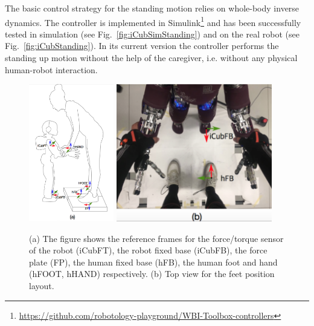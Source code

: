 The basic control strategy for the standing motion relies on whole-body inverse dynamics.
The controller is implemented in Simulink\footnote{\url{https://github.com/robotology-playground/WBI-Toolbox-controllers}}
and has been successfully tested in 
simulation (see Fig.~\ref{fig:iCubSimStanding}) and on the real robot (see Fig.~\ref{fig:iCubStanding}).
In its current version the controller performs the standing up motion without the help
of the caregiver, i.e. without any physical human-robot interaction. 

  
%
\begin{figure}[ht]
  \centering
    \includegraphics[height=6cm]{figs/interaction_lateralAndTop2} \hspace{1cm}
    \includegraphics[height=6cm]{figs/interaction_lateralAndTop}
          \caption{(a) The figure shows the
		  reference frames for the force/torque sensor of the robot (iCubFT), the robot fixed
		   base (iCubFB), the force plate (FP), the human fixed base (hFB), the human foot and
		    hand (hFOOT, hHAND) respectively. (b) Top view for the feet position layout.}
			\label{fig:interaction_lateral&top}
\end{figure}

